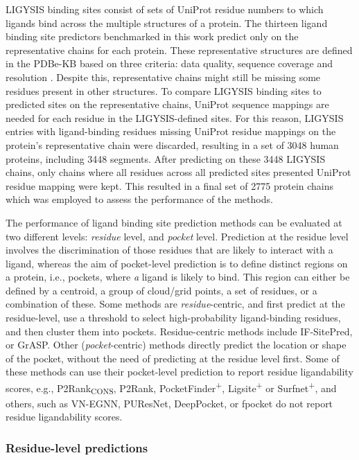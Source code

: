LIGYSIS binding sites consist of sets of UniProt residue numbers to which ligands bind across the multiple structures of a protein. The thirteen ligand binding site predictors benchmarked in this work predict only on the representative chains for each protein. These representative structures are defined in the PDBe-KB based on three criteria: data quality, sequence coverage and resolution \cite{ELLAWAY_2024_CONFORMATIONS}. Despite this, representative chains might still be missing some residues present in other structures. To compare LIGYSIS binding sites to predicted sites on the representative chains, UniProt sequence mappings are needed for each residue in the LIGYSIS-defined sites. For this reason, LIGYSIS entries with ligand-binding residues missing UniProt residue mappings on the protein's representative chain were discarded, resulting
in a set of 3048 human proteins, including 3448 segments. After predicting on these 3448 LIGYSIS chains, only chains where all residues across all predicted sites presented UniProt residue mapping were kept. This resulted in a final set of 2775 protein chains which was employed to assess the performance of the methods.

The performance of ligand binding site prediction methods can be evaluated at two different levels: \textit{residue} level, and \textit{pocket} level. Prediction at the residue level involves the discrimination of those residues that are likely to interact with a ligand, whereas the aim of pocket-level prediction is to define distinct regions on a protein, i.e., pockets, where \textit{a} ligand is likely to bind. This region can either be defined by a centroid, a group of cloud/grid points, a set of residues, or a combination of these. Some methods are \textit{residue}-centric, and first predict at the residue-level, use a threshold to select high-probability ligand-binding residues, and then cluster them into pockets. Residue-centric methods include IF-SitePred, or GrASP. Other (\textit{pocket}-centric) methods directly predict the location or shape of the pocket, without the need of predicting at the residue level first. Some of these methods can use their pocket-level prediction to report residue ligandability scores, e.g., P2Rank\textsubscript{CONS}, P2Rank, PocketFinder\textsuperscript{+}, Ligsite\textsuperscript{+} or Surfnet\textsuperscript{+}, and others, such as VN-EGNN, PUResNet, DeepPocket, or fpocket do not report residue ligandability scores.

\FloatBarrier

\subsubsection{Residue-level predictions}

